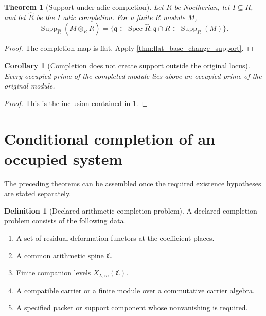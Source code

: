 \documentclass{aomart}
\newtheorem{theorem}{Theorem}[section]
\newtheorem{corollary}[corollary]{Corollary}
\theoremstyle{definition}
\newtheorem{definition}[definition]{Definition}
\theoremstyle{remark}
\newcommand{\Spec}{\operatorname{Spec}}
\newcommand{\Supp}{\operatorname{Supp}}
\newcommand{\mathfrakC}{\mathfrak C}
\begin{document}
\begin{theorem}[Support under adic completion]\label{thm:support_completion}
Let \(R\) be Noetherian, let \(I\subseteq R\), and let \(\widehat R\) be the \(I\) adic completion. For a finite \(R\) module \(M\),
\[
\boxed{
\Supp_{\widehat R}(M\otimes_R\widehat R)
=
\{\mathfrak q\in\Spec\widehat R:
\mathfrak q\cap R\in\Supp_R(M)\}.
}
\]
\end{theorem}

\begin{proof}
The completion map is flat. Apply \cref{thm:flat_base_change_support}.
\end{proof}

\begin{corollary}[Completion does not create support outside the original locus]\label{cor:completion_support_boundary}
Every occupied prime of the completed module lies above an occupied prime of the original module.
\end{corollary}

\begin{proof}
This is the inclusion contained in \cref{thm:support_completion}.
\end{proof}

\section{Conditional completion of an occupied system}\label{sec:completion}

The preceding theorems can be assembled once the required existence hypotheses are stated separately.

\begin{definition}[Declared arithmetic completion problem]\label{def:declared_completion_problem}
A declared completion problem consists of the following data.
\begin{enumerate}
\item A set of residual deformation functors at the coefficient places.
\item A common arithmetic spine \(\mathfrakC\).
\item Finite companion levels \(X_{\lambda,m}(\mathfrakC)\).
\item A compatible carrier or a finite module over a commutative carrier algebra.
\item A specified packet or support component whose nonvanishing is required.
\end{enumerate}
\end{definition}
\end{document}

